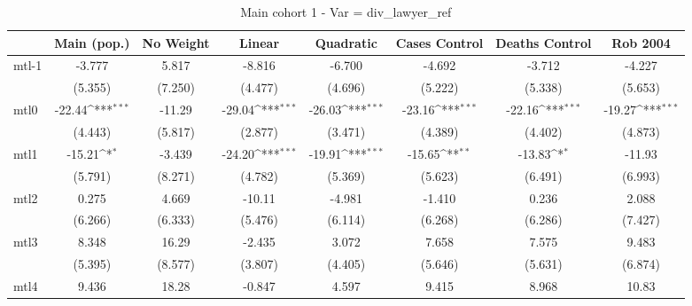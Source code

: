 \documentclass{article}
\begin{document}
{
\def\sym#1{\ifmmode^{#1}\else\(^{#1}\)\fi}
\begin{longtable}{l*{7}{c}}
\caption{Main cohort 1 - Var = div\_lawyer\_ref}\\
\hline\hline\endfirsthead\hline\endhead\hline\endfoot\endlastfoot
                &\multicolumn{1}{c}{Main (pop.)}&\multicolumn{1}{c}{No Weight}&\multicolumn{1}{c}{Linear}&\multicolumn{1}{c}{Quadratic}&\multicolumn{1}{c}{Cases Control}&\multicolumn{1}{c}{Deaths Control}&\multicolumn{1}{c}{Rob 2004}\\
\hline
mtl-1           &   -3.777         &    5.817         &   -8.816         &   -6.700         &   -4.692         &   -3.712         &   -4.227         \\
                &  (5.355)         &  (7.250)         &  (4.477)         &  (4.696)         &  (5.222)         &  (5.338)         &  (5.653)         \\
mtl0            &   -22.44\sym{***}&   -11.29         &   -29.04\sym{***}&   -26.03\sym{***}&   -23.16\sym{***}&   -22.16\sym{***}&   -19.27\sym{***}\\
                &  (4.443)         &  (5.817)         &  (2.877)         &  (3.471)         &  (4.389)         &  (4.402)         &  (4.873)         \\
mtl1            &   -15.21\sym{*}  &   -3.439         &   -24.20\sym{***}&   -19.91\sym{***}&   -15.65\sym{**} &   -13.83\sym{*}  &   -11.93         \\
                &  (5.791)         &  (8.271)         &  (4.782)         &  (5.369)         &  (5.623)         &  (6.491)         &  (6.993)         \\
mtl2            &    0.275         &    4.669         &   -10.11         &   -4.981         &   -1.410         &    0.236         &    2.088         \\
                &  (6.266)         &  (6.333)         &  (5.476)         &  (6.114)         &  (6.268)         &  (6.286)         &  (7.427)         \\
mtl3            &    8.348         &    16.29         &   -2.435         &    3.072         &    7.658         &    7.575         &    9.483         \\
                &  (5.395)         &  (8.577)         &  (3.807)         &  (4.405)         &  (5.646)         &  (5.631)         &  (6.874)         \\
mtl4            &    9.436         &    18.28         &   -0.847         &    4.597         &    9.415         &    8.968         &    10.83         \\

\end{longtable}}
\end{document}
